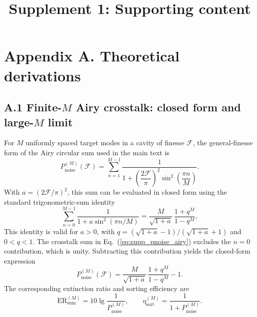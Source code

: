 \documentclass{optica-article}%
\begin{document}
\title{Supplement 1: Supporting content}

\renewcommand{\thefigure}{S\arabic{figure}}
\renewcommand{\thetable}{S\arabic{table}}
\renewcommand{\theequation}{S\arabic{equation}}

\section*{Appendix A. Theoretical derivations}

\subsection*{A.1 Finite-$M$ Airy crosstalk: closed form and large-$M$ limit}

For $M$ uniformly spaced target modes in a cavity of finesse $\mathcal{F}$, the general-finesse form of the Airy circular sum used in the main text is
\begin{equation}
P_{\mathrm{noise}}^{(M)}(\mathcal{F})
=\sum_{n=1}^{M-1}
\frac{1}{1+\left(\dfrac{2\mathcal{F}}{\pi}\right)^{\!2}\sin^2\!\!\left(\dfrac{\pi n}{M}\right)}.
\label{eq:supp_pnoise_airy}
\end{equation}
With $a=(2\mathcal{F}/\pi)^2$, this sum can be evaluated in closed form using the standard trigonometric-sum identity
\begin{equation}
\sum_{n=0}^{M-1}\frac{1}{1+a\sin^2(\pi n/M)}
=\frac{M}{\sqrt{1+a}}\,\frac{1+q^M}{1-q^M},
\label{eq:supp_trig_identity}
\end{equation}
This identity is valid for $a>0$, with $q=(\sqrt{1+a}-1)/(\sqrt{1+a}+1)$ and $0<q<1$. The crosstalk sum in Eq.~(\ref{eq:supp_pnoise_airy}) excludes the $n=0$ contribution, which is unity. Subtracting this contribution yields the closed-form expression
\begin{equation}
P_{\mathrm{noise}}^{(M)}(\mathcal{F})
=\frac{M}{\sqrt{1+a}}\,\frac{1+q^M}{1-q^M}-1.
\label{eq:supp_pnoise_closed}
\end{equation}
The corresponding extinction ratio and sorting efficiency are
\begin{equation}
\mathrm{ER}_{\mathrm{sum}}^{(M)}=10\lg\frac{1}{P_{\mathrm{noise}}^{(M)}},
\qquad
\eta_{\mathrm{sort}}^{(M)}=\frac{1}{1+P_{\mathrm{noise}}^{(M)}}.
\label{eq:supp_er_eta}
\end{equation}
\end{document}
